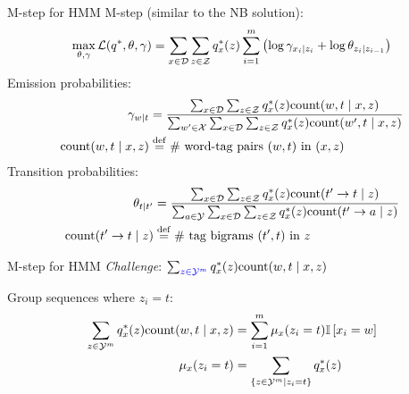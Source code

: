 \documentclass[usenames,dvipsnames,notes]{beamer}
\begin{document}
\begin{frame}
    {M-step for HMM}
    M-step (similar to the NB solution):
    \begin{align*}
        \max_{\theta,\gamma} \mathcal{L}(q^*, \theta, \gamma) = \sum_{x\in\mathcal{D}} \sum_{z\in\mathcal{Z}} q^*_x(z)
        \sum_{i=1}^m \left(  \log\gamma_{x_i\mid z_i} + \log \theta_{z_i\mid z_{i-1}}  \right)
    \end{align*}
    Emission probabilities:
    \begin{align*}
        \gamma_{w\mid t} &= \frac{
            \sum_{x\in\mathcal{D}} \sum_{z\in\mathcal{Z}} q^*_x(z) \text{count}(w,t\mid x,z)
        }{
            \sum_{w'\in\mathcal{X}} \sum_{x\in\mathcal{D}} \sum_{z\in\mathcal{Z}} q^*_x(z) \text{count}(w',t\mid x,z)
        }\\
        \text{count}(w,t\mid x,z) &\stackrel{\rm def}{=} \text{\# word-tag pairs $(w,t)$ in $(x,z)$} 
    \end{align*}
    Transition probabilities:
    \begin{align*}
        \theta_{t\mid t'} &= \frac{
            \sum_{x\in\mathcal{D}} \sum_{z\in\mathcal{Z}} q^*_x(z) \text{count}(t'\rightarrow t\mid z)
        }{
            \sum_{a\in\mathcal{Y}} \sum_{x\in\mathcal{D}} \sum_{z\in\mathcal{Z}} q^*_x(z) \text{count}(t'\rightarrow a\mid z)
        }\\
        \text{count}(t'\rightarrow t\mid z) &\stackrel{\rm def}{=} \text{\# tag bigrams $(t',t)$ in $z$} 
    \end{align*}
\end{frame}

\begin{frame}
    {M-step for HMM}
    \emph{Challenge}: $\sum_{{\color{blue}z\in\mathcal{Y}^m}} q^*_x(z) \text{count}(w,t\mid x,z)$

    \vspace{5em}
    
    \begin{center}
    \end{center}
    Group sequences where $z_i=t$:
    \begin{align*}
    \sum_{{z\in\mathcal{Y}^m}} q^*_x(z) \text{count}(w,t\mid x,z)
        &= \sum_{i=1}^m \mu_x(z_i=t) \mathbb{I}\left[ x_i=w \right] \\
        \mu_x(z_i=t) &= \sum_{\left\{ z\in\mathcal{Y}^m \mid z_i=t \right\}} q^*_x(z)
    \end{align*}
\end{frame}
\end{document}
